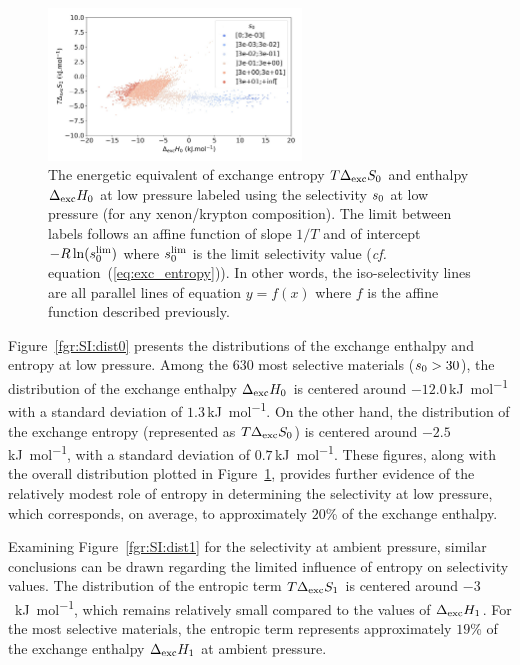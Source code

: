 \documentclass[main.tex]{subfiles}
\begin{document}
\begin{figure}[t]
\centering
  \includegraphics[width=0.6\textwidth]{figures/2-thermo/enthalpy_entropy_0_s_0.jpg}
  \caption{The energetic equivalent of exchange entropy $T\Delta_{\text{exc}}S_{\text{0}}$ and enthalpy $\Delta_{\text{exc}}H_{\text{0}}$ at low pressure labeled using the selectivity $s_{\text{0}}$ at low pressure (for any xenon/krypton composition). The limit between labels follows an affine function of slope $1/T$ and of intercept $-R\ln(s_{\text{0}}^{\text{lim}})$ where $s_{\text{0}}^{\text{lim}}$ is the limit selectivity value (\emph{cf.} equation~(\ref{eq:exc_entropy})). In other words, the iso-selectivity lines are all parallel lines of equation $y=f(x)$ where $f$ is the affine function described previously.}\label{fgr:HSplot_0}
\end{figure}


Figure~\ref{fgr:SI:dist0} presents the distributions of the exchange enthalpy and entropy at low pressure. Among the 630 most selective materials ($s_{\text{0}} > 30$), the distribution of the exchange enthalpy $\Delta_{\text{exc}}H_{\text{0}}$ is centered around $-12.0$\,\si{\kilo\joule\per\mol} with a standard deviation of $1.3$\,\si{\kilo\joule\per\mol}. On the other hand, the distribution of the exchange entropy (represented as $T\Delta_{\text{exc}}S_{\text{0}}$) is centered around $-2.5$\,\si{\kilo\joule\per\mol}, with a standard deviation of $0.7$\,\si{\kilo\joule\per\mol}. These figures, along with the overall distribution plotted in Figure~\ref{fgr:HSplot_0}, provides further evidence of the relatively modest role of entropy in determining the selectivity at low pressure, which corresponds, on average, to approximately {$20$\%} of the exchange enthalpy.

Examining Figure~\ref{fgr:SI:dist1} for the selectivity at ambient pressure, similar conclusions can be drawn regarding the limited influence of entropy on selectivity values. The distribution of the entropic term $T\Delta_{\text{exc}}S_{\text{1}}$ is centered around $-3$~\si{\kilo\joule\per\mole}, which remains relatively small compared to the values of $\Delta_{\text{exc}}H_{\text{1}}$. For the most selective materials, the entropic term represents approximately {$19$\%} of the exchange enthalpy $\Delta_{\text{exc}}H_{\text{1}}$ at ambient pressure.
\end{document}
